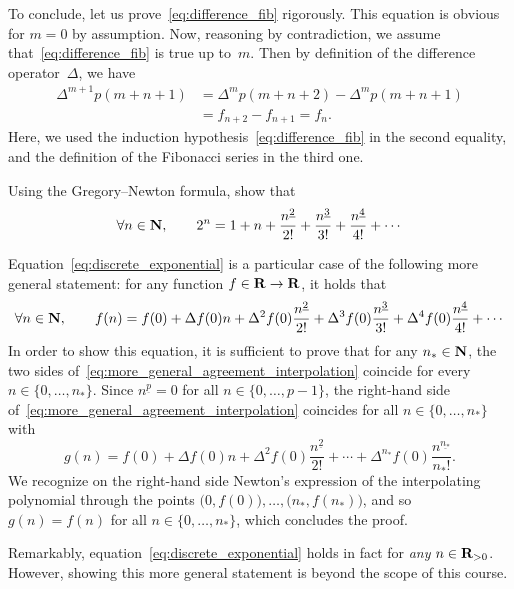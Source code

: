 \begin{solution}
    To conclude, let us prove~\eqref{eq:difference_fib} rigorously.
    This equation is obvious for $m = 0$ by assumption.
    Now, reasoning by contradiction, we assume that~\eqref{eq:difference_fib} is true up to~$m$.
    Then by definition of the difference operator~$\Delta$,
    we have
    \begin{align*}
        \Delta^{m+1} p(m+n+1)
        &= \Delta^m p(m+n+2) - \Delta^m p(m+n+1) \\
        &= f_{n+2} - f_{n+1} = f_n.
    \end{align*}
    Here, we used the induction hypothesis~\eqref{eq:difference_fib} in the second equality,
    and the definition of the Fibonacci series in the third one.
\end{solution}

\begin{exercise}
    Using the Gregory--Newton formula,
    show that
    \begin{equation}
        \label{eq:discrete_exponential}
        \forall n \in \mathbf N,
        \qquad 2^n = 1 + n + \frac{n^{\underline{2}}}{2!} + \frac{n^{\underline 3}}{3!} + \frac{n^{\underline 4}}{4!} + \dotsb
    \end{equation}
    \begin{solution}
        Equation~\eqref{eq:discrete_exponential} is a particular case of the following more general statement:
        for any function $f \in \mathbf R \to \mathbf R$,
        it holds that
        \begin{equation}
            \label{eq:more_general_agreement_interpolation}
            \forall n \in \mathbf N,
            \qquad f(n) = f(0) + \Delta f(0) n + \Delta^2 f(0) \frac{n^{\underline{2}}}{2!} + \Delta^3 f(0) \frac{n^{\underline 3}}{3!} + \Delta^4 f(0) \frac{n^{\underline 4}}{4!} + \dotsb
        \end{equation}
        In order to show this equation,
        it is sufficient to prove that for any $n_* \in \mathbf N$,
        the two sides of~\eqref{eq:more_general_agreement_interpolation} coincide for every $n \in \{0, \dotsc, n_*\}$.
        Since $n^{\underline p} = 0$ for all $n \in \{0, \dotsc, p-1\}$,
        the right-hand side of~\eqref{eq:more_general_agreement_interpolation} coincides for all $n \in \{0, \dotsc, n_*\}$ with
        \[
            g(n) = f(0) + \Delta f(0) n + \Delta^2 f(0) \frac{n^{\underline{2}}}{2!} + \dotsb + \Delta^{n_*} f(0) \frac{n^{\underline {n_*}}}{{n_*}!}.
        \]
        We recognize on the right-hand side Newton's expression of the interpolating polynomial through the points $\bigl(0, f(0)\bigr), \dotsc, \bigl(n_*, f(n_*)\bigr)$,
        and so $g(n) = f(n)$ for all $n \in \{0, \dotsc, n_*\}$,
        which concludes the proof.
    \end{solution}
    \begin{remark}
        Remarkably, equation~\eqref{eq:discrete_exponential} holds in fact for \emph{any} $n \in \mathbf R_{> 0}$.
        However, showing this more general statement is beyond the scope of this course.
    \end{remark}
\end{exercise}

